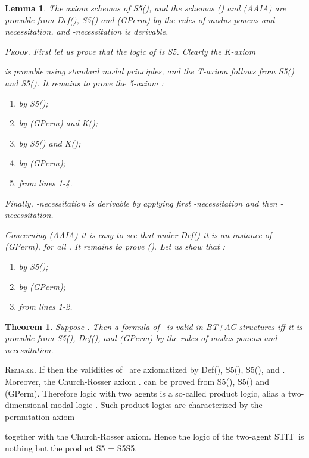 \documentclass{article}
\newtheorem{theorem}{Theorem}
\newtheorem{lemma}{Lemma}
\newenvironment{remark}{\medskip\noindent \textsc{Remark.}} {\medskip}
\newenvironment{pf}{\em \medskip\noindent \textsc{Proof.}}
{\hspace*{\fill}\nolinebreak[2]\hspace*{\fill}\medskip}
\newcommand{\InclBox}[1]{}
\newcommand{\STIT} {{\textsf{STIT}}}              \newcommand{\CSTIT}{{\textsf{CSTIT}}}            \newcommand{\DSTIT}{{\textsf{DSTIT}}}
\newcommand{\LCSTIT}{}
\begin{document}
\begin{lemma}\label{lem:BoxIsS5}
The axiom schemas of S5(),
and the schemas (\InclBox{i}) and (AAIA)
are provable from Def(), S5() and (GPerm)
by the rules of modus ponens and -necessitation,
and -necessitation is derivable.

\begin{pf}
First let us prove that the logic of  is S5.
Clearly the K-axiom

is provable using standard modal principles, and the T-axiom
 follows from S5() and S5().
It remains to prove the 5-axiom :
\begin{enumerate}
\item
  \hfill by S5();
\item
  \hfill by (GPerm)
                                                      and K();
\item
  \hfill by S5()
                                                      and K();
\item
  \hfill by (GPerm);
\item
  \hfill from lines 1-4.
\end{enumerate}
Finally, -necessitation is derivable
by applying first -necessitation and then -necessitation.

Concerning (AAIA) it is easy to see that under Def()
it is an instance of (GPerm), for all .
It remains to prove (\InclBox{i}).
Let us show that :
\begin{enumerate}
\item              \hfill by S5();
\item  \hfill by (GPerm);
\item  \hfill from lines 1-2.
\end{enumerate}

\end{pf}

\end{lemma}


\begin{theorem}\label{cool-theo}
Suppose .
Then a formula of \LCSTIT\ is valid in BT+AC structures
iff it is provable from
S5(),        
Def(),    
and (GPerm)                 
by the rules of modus ponens and -necessitation.
\end{theorem}

\begin{remark}
If  then the validities of \LCSTIT\ are axiomatized by Def(),
S5(), S5(), and
.
Moreover, the Church-Rosser axiom
.
can be proved from S5(), S5() and (GPerm).
Therefore  logic with two agents is a so-called product logic,
alias a two-dimensional modal logic \cite{Marx99,GabbayEtAl03}.
Such product logics are characterized by the permutation axiom

together with the Church-Rosser axiom.
Hence the logic of the two-agent \STIT\ is nothing but the product
S5 = S5S5.
\end{remark}
\end{document}
